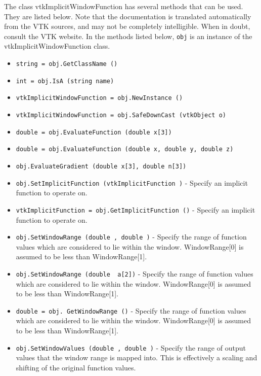 The class vtkImplicitWindowFunction has several methods that can be used.
  They are listed below.
Note that the documentation is translated automatically from the VTK sources,
and may not be completely intelligible.  When in doubt, consult the VTK website.
In the methods listed below, \verb|obj| is an instance of the vtkImplicitWindowFunction class.
\begin{itemize}
\item  \verb|string = obj.GetClassName ()|

\item  \verb|int = obj.IsA (string name)|

\item  \verb|vtkImplicitWindowFunction = obj.NewInstance ()|

\item  \verb|vtkImplicitWindowFunction = obj.SafeDownCast (vtkObject o)|

\item  \verb|double = obj.EvaluateFunction (double x[3])|

\item  \verb|double = obj.EvaluateFunction (double x, double y, double z)|

\item  \verb|obj.EvaluateGradient (double x[3], double n[3])|

\item  \verb|obj.SetImplicitFunction (vtkImplicitFunction )| -  Specify an implicit function to operate on.

\item  \verb|vtkImplicitFunction = obj.GetImplicitFunction ()| -  Specify an implicit function to operate on.

\item  \verb|obj.SetWindowRange (double , double )| -  Specify the range of function values which are considered to lie within
 the window. WindowRange[0] is assumed to be less than WindowRange[1].

\item  \verb|obj.SetWindowRange (double  a[2])| -  Specify the range of function values which are considered to lie within
 the window. WindowRange[0] is assumed to be less than WindowRange[1].

\item  \verb|double = obj. GetWindowRange ()| -  Specify the range of function values which are considered to lie within
 the window. WindowRange[0] is assumed to be less than WindowRange[1].

\item  \verb|obj.SetWindowValues (double , double )| -  Specify the range of output values that the window range is mapped
 into. This is effectively a scaling and shifting of the original
 function values.


\end{itemize}
